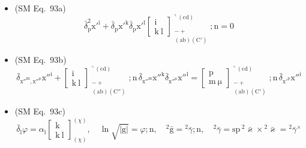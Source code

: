 \documentclass[12pt]{article}
\begin{document}
\begin{itemize}[label={},leftmargin=0pt]
    \item (SM Eq.\ 93a) 
    \[
    \bar{\delta}_\mathrm{p}^2 \mathrm{x'^i} + \bar{\delta}_\mathrm{p} \mathrm{x'^k} \bar{\delta}_\mathrm{p} \mathrm{x'^l} \left[ \begin{smallmatrix} \mathrm{i} \\ \mathrm{k\ l} \end{smallmatrix} \right]^{\urcorner(\mathrm{cd})}_{\substack{- + \\ (\mathrm{ab})(\mathrm{C'})}} ; \mathrm{n} = 0
    \]

    \item (SM Eq.\ 93b) 
    \[
    \bar{\delta}_{\mathrm{x''^m}, \mathrm{x''^\mu}} \mathrm{x''^i} + \left[ \begin{smallmatrix} \mathrm{i} \\ \mathrm{k\ l} \end{smallmatrix} \right]^{\urcorner(\mathrm{cd})}_{\substack{- + \\ (\mathrm{ab})(\mathrm{C''})}} ; \mathrm{n} \,\bar{\delta}_{\mathrm{x''^m}} \mathrm{x''^k} \bar{\delta}_{\mathrm{x''^\mu}} \mathrm{x''^l} = \left[ \begin{smallmatrix} \mathrm{p} \\ \mathrm{m\ \mu} \end{smallmatrix} \right]^{\urcorner(\mathrm{cd})}_{\substack{- + \\ (\mathrm{ab})(\mathrm{C'})}} ; \mathrm{n} \,\bar{\delta}_{\mathrm{x'^p}} \mathrm{x''^i}
    \]

    \item (SM Eq.\ 93c) 
    \[
    \bar{\delta}_\mathrm{l} \varphi = \alpha_\mathrm{l} \left[ \begin{smallmatrix} \mathrm{k} \\ \mathrm{k\ l} \end{smallmatrix} \right]^{(\chi)}_{(\chi)}, \quad \ln\sqrt{|\mathrm{g}|} = \varphi;\mathrm{n}, \quad {}^2\bar{\mathrm{g}} = {}^2\bar{\gamma};\mathrm{n}, \quad {}^2\bar{\gamma} = \mathrm{sp}\,{}^2\bar{\varkappa} \times {}^2\bar{\varkappa} = {}^2\bar{\gamma}^\times
    \]


\end{itemize}
\end{document}
